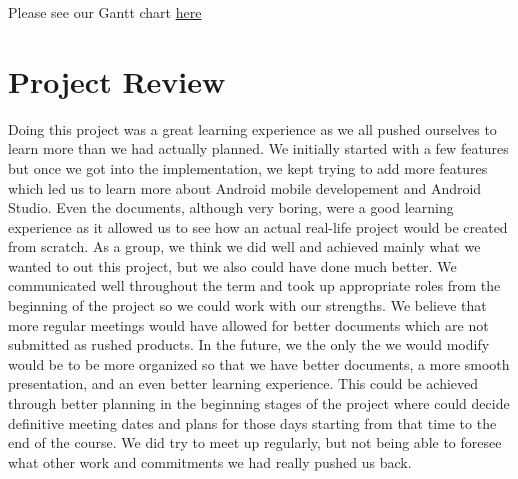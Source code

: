 \documentclass{article}
\begin{document}
Please see our Gantt chart \href{https://gitlab.cas.mcmaster.ca/kowserm/3xa3/blob/master/Doc/Design/Gantt%20Chart/project_gantt.gan}{here}

\section{Project Review}
{\color{red} Doing this project was a great learning experience as we all pushed ourselves to learn more than we had actually planned. We initially started with a few features but once we got into the implementation, we kept trying to add more features which led us to learn more about Android mobile developement and Android Studio. Even the documents, although very boring, were a good learning experience as it allowed us to see how an actual real-life project would be created from scratch. As a group, we think we did well and achieved mainly what we wanted to out this project, but we also could have done much better. We communicated well throughout the term and took up appropriate roles from the beginning of the project so we could work with our strengths. We believe that more regular meetings would have allowed for better documents which are not submitted as rushed products. In the future, we the only the we would modify would be to be more organized so that we have better documents, a more smooth presentation, and an even better learning experience. This could be achieved through better planning in the beginning stages of the project where could decide definitive meeting dates and plans for those days starting from that time to the end of the course. We did try to meet up regularly, but not being able to foresee what other work and commitments we had really pushed us back.}
\end{document}
